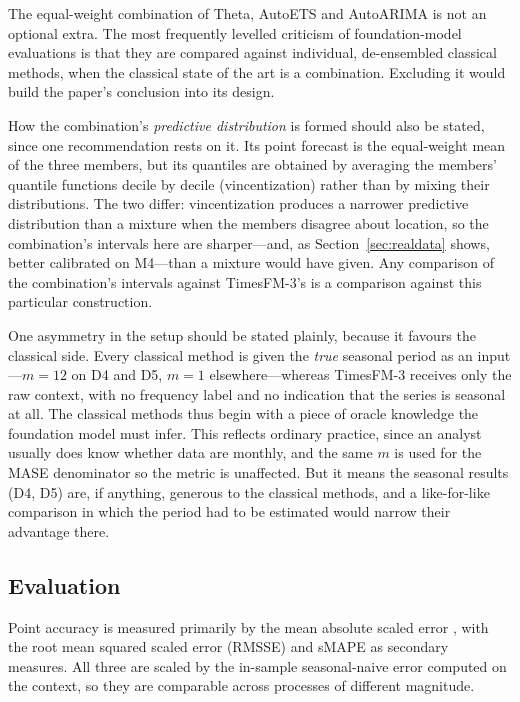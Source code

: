 \documentclass[article]{ajs}
\providecommand{\sectionref}[1]{Section~\ref{#1}}
\begin{document}
The equal-weight combination of Theta, AutoETS and AutoARIMA is not an optional extra. The
most frequently levelled criticism of foundation-model evaluations is that they are compared
against individual, de-ensembled classical methods, when the classical state of the art is a
combination. Excluding it would build the paper's conclusion into its design.

How the combination's \emph{predictive distribution} is formed should also be stated, since one
recommendation rests on it. Its point forecast is the equal-weight mean of the three members, but
its quantiles are obtained by averaging the members' quantile functions decile by decile
(vincentization) rather than by mixing their distributions. The two differ: vincentization
produces a narrower predictive distribution than a mixture when the members disagree about
location, so the combination's intervals here are sharper---and, as \sectionref{sec:realdata}
shows, better calibrated on M4---than a mixture would have given. Any comparison of the
combination's intervals against TimesFM-3's is a comparison against this particular construction.

One asymmetry in the setup should be stated plainly, because it favours the classical side.
Every classical method is given the \emph{true} seasonal period as an input---$m = 12$ on D4 and
D5, $m = 1$ elsewhere---whereas TimesFM-3 receives only the raw context, with no frequency label
and no indication that the series is seasonal at all. The classical methods thus begin with a
piece of oracle knowledge the foundation model must infer. This reflects ordinary practice, since
an analyst usually does know whether data are monthly, and the same $m$ is used for the MASE
denominator so the metric is unaffected. But it means the seasonal results (D4, D5) are, if
anything, generous to the classical methods, and a like-for-like comparison in which the period
had to be estimated would narrow their advantage there.

\subsection{Evaluation}
\label{sec:evaluation}

Point accuracy is measured primarily by the mean absolute scaled error
\citep[MASE;][]{hyndman2006mase}, with the root mean squared scaled error (RMSSE) and sMAPE
as secondary measures. All three are scaled by the in-sample seasonal-naive error computed on
the context, so they are comparable across processes of different magnitude.
\end{document}
